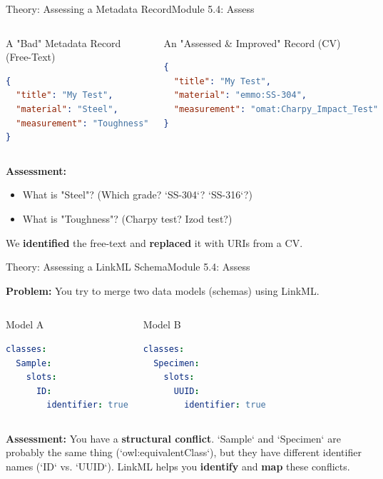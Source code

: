 \begin{frame}[fragile]{Theory: Assessing a Metadata Record}{Module 5.4: Assess}
\begin{columns}
    \begin{block}{A "Bad" Metadata Record (Free-Text)}
\begin{lstlisting}[language=json]
{
  "title": "My Test",
  "material": "Steel",
  "measurement": "Toughness"
}
\end{lstlisting}
    \end{block}
        
    \begin{block}{An "Assessed \& Improved" Record (CV)}
\begin{lstlisting}[language=json]
{
  "title": "My Test",
  "material": "emmo:SS-304",
  "measurement": "omat:Charpy_Impact_Test"
}
\end{lstlisting}
    \end{block}
\end{columns}
    \pause
    \textbf{Assessment:}
    \begin{itemize}
        \item What is "Steel"? (Which grade? `SS-304`? `SS-316`?)
        \item What is "Toughness"? (Charpy test? Izod test?)
    \end{itemize}
    \pause

    We \textbf{identified} the free-text and \textbf{replaced} it with URIs from a CV.
\end{frame}

\begin{frame}[fragile]{Theory: Assessing a LinkML Schema}{Module 5.4: Assess}

    \textbf{Problem:} You try to merge two data models (schemas) using LinkML.
    \bigskip
    
    \begin{columns}
        \begin{block}{Model A}
            \begin{lstlisting}[language=yaml]
classes:
  Sample:
    slots:
      ID:
        identifier: true
            \end{lstlisting}
        \end{block}
        \pause
        \begin{block}{Model B}
            \begin{lstlisting}[language=yaml]
classes:
  Specimen:
    slots:
      UUID:
        identifier: true
            \end{lstlisting}
        \end{block}
        
    \end{columns}
    \vfill
    \pause
    \textbf{Assessment:} You have a \textbf{structural conflict}. `Sample` and `Specimen` are probably the same thing (`owl:equivalentClass`), but they have different identifier names (`ID` vs. `UUID`). LinkML helps you \textbf{identify} and \textbf{map} these conflicts.
\end{frame}

